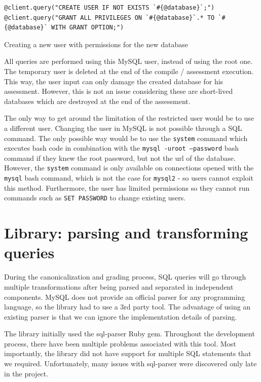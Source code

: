 \begin{code}
\begin{verbatim}
@client.query("CREATE USER IF NOT EXISTS `#{@database}`;")
@client.query("GRANT ALL PRIVILEGES ON `#{@database}`.* TO `#{@database}` WITH GRANT OPTION;")
\end{verbatim}
\caption{Creating a new user with permissions for the new database}
\label{fig:creating_new_user}
\end{code}

All queries are performed using this MySQL user, instead of using the root one. The temporary user is deleted at the end of the compile / assessment execution. This way, the user input can only damage the created database for his assessment. However, this is not an issue considering these are short-lived databases which are destroyed at the end of the assessment.

The only way to get around the limitation of the restricted user would be to use a different user. Changing the user in MySQL is not possible through a SQL command. The only possible way would be to use the \texttt{system} command which executes bash code in combination with the \texttt{mysql -uroot --password} bash command if they knew the root password, but not the url of the database. However, the \texttt{system} command is only available on connections opened with the \texttt{mysql} bash command, which is not the case for \texttt{mysql2} - so users cannot exploit this method. Furthermore, the user has limited permissions so they cannot run commands such as \texttt{SET PASSWORD} to change existing users.

\section{Library: parsing and transforming queries}

During the canonicalization and grading process, SQL queries will go through multiple transformations after being parsed and separated in independent components. MySQL does not provide an official parser for any programming language, so the library had to use a 3rd party tool. The advantage of using an existing parser is that we can ignore the implementation details of parsing.

The library initially used the sql-parser Ruby gem. Throughout the development process, there have been multiple problems associated with this tool. Most importantly, the library did not have support for multiple SQL statements that we required. Unfortunately, many issues with sql-parser were discovered only late in the project.


